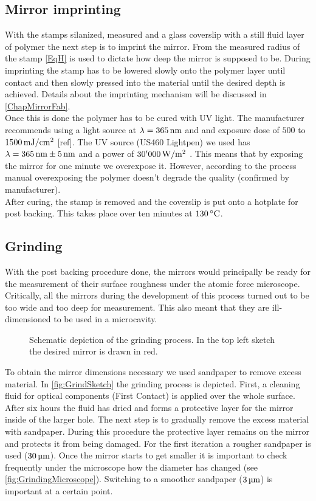 \subsection{Mirror imprinting}
With the stamps silanized, measured and a glass coverslip with a still fluid layer of polymer the next step is to imprint the mirror. From the measured radius of the stamp \autoref{EqH} is used to dictate how deep the mirror is supposed to be. During imprinting the stamp has to be lowered slowly onto the polymer layer until contact and then slowly pressed into the material until the desired depth is achieved. Details about the imprinting mechanism will be discussed in \autoref{ChapMirrorFab}.\\
Once this is done the polymer has to be cured with UV light. The manufacturer recommends using a light source at $\lambda=365\nm$ and and exposure dose of $500$ to $1500 \mJcm$ [ref]. The UV source (US460 Lightpen) we used has $\lambda = 365\nm \pm 5\nm$ and a power of $30'000\Wm$ \cite{ormocompProcess}. This means that by exposing the mirror for one minute we overexpose it. However, according to the process manual overexposing the polymer doesn't degrade the quality (confirmed by manufacturer).\\
After curing, the stamp is removed and the coverslip is put onto a hotplate for post backing. This takes place over ten minutes at $130\degrees$.

\subsection{Grinding}\label{ChapGrinding}
With the post backing procedure done, the mirrors would principally be ready for the measurement of their surface roughness under the atomic force microscope. Critically, all the mirrors during the development of this process turned out to be too wide and too deep for measurement. This also meant that they are ill-dimensioned to be used in a microcavity.

\begin{figure}[H]
	
	\caption{Schematic depiction of the grinding process. In the top left sketch the desired mirror is drawn in red.}
	\label{fig:GrindSketch}
\end{figure}

To obtain the mirror dimensions necessary we used sandpaper to remove excess material. In \autoref{fig:GrindSketch} the grinding process is depicted. First, a cleaning fluid for optical components (First Contact) is applied over the whole surface. After six hours the fluid has dried and forms a protective layer for the mirror inside of the larger hole. The next step is to gradually remove the excess material with sandpaper. During this procedure the protective layer remains on the mirror and protects it from being damaged. For the first iteration a rougher sandpaper is used ($30\um$). Once the mirror starts to get smaller it is important to check frequently under the microscope how the diameter has changed (see \autoref{fig:GrindingMicroscope}). Switching to a smoother sandpaper ($3\um$) is important at a certain point.

